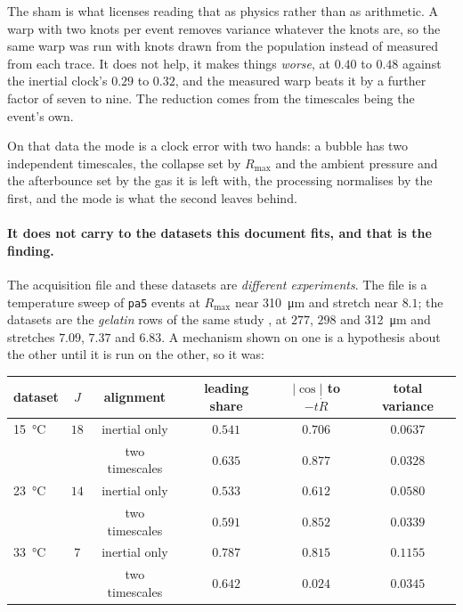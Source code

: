 \documentclass[10pt]{article}
\begin{document}
The sham is what licenses reading that as physics rather than as arithmetic. A warp with two
knots per event removes variance whatever the knots are, so the same warp was run with knots
drawn from the population instead of measured from each trace. It does not help, it makes
things \emph{worse}, at $0.40$ to $0.48$ against the inertial clock's $0.29$ to $0.32$, and the
measured warp beats it by a further factor of seven to nine. The reduction comes from the
timescales being the event's own.

On that data the mode is a clock error with two hands: a bubble has two independent timescales,
the collapse set by $R_{\max}$ and the ambient pressure and the afterbounce set by the gas it is
left with, the processing normalises by the first, and the mode is what the second leaves behind.

\paragraph{It does not carry to the datasets this document fits, and that is the finding.}
The acquisition file and these datasets are \emph{different experiments}. The file is a
temperature sweep of \texttt{pa5} events at $R_{\max}$ near \SI{310}{\micro\metre} and stretch
near $8.1$; the datasets are the \emph{gelatin} rows of the same study \citep{chu2026limits},
at $277$, $298$ and \SI{312}{\micro\metre} and stretches $7.09$, $7.37$ and $6.83$. A mechanism shown on one is a
hypothesis about the other until it is run on the other, so it was:

\begin{center}
\begin{tabular}{lccccc}
\toprule
dataset & $J$ & alignment & leading share & $\lvert\cos\rvert$ to $-t\dot R$ & total variance \\
\midrule
\SI{15}{\celsius} & $18$ & inertial only & $0.541$ & $0.706$ & $0.0637$ \\
 & & two timescales & $0.635$ & $\mathbf{0.877}$ & $0.0328$ \\
\SI{23}{\celsius} & $14$ & inertial only & $0.533$ & $0.612$ & $0.0580$ \\
 & & two timescales & $0.591$ & $\mathbf{0.852}$ & $0.0339$ \\
\SI{33}{\celsius} & $7$ & inertial only & $0.787$ & $0.815$ & $0.1155$ \\
 & & two timescales & $0.642$ & $\mathbf{0.024}$ & $0.0345$ \\
\bottomrule
\end{tabular}
\end{center}
\end{document}
